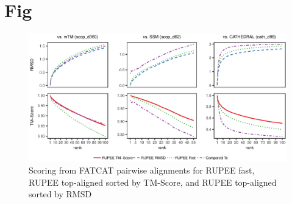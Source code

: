\documentclass[letter]{article}
\begin{document}
\section{Fig}

\begin{figure}[!h]
\begin{center}
    \includegraphics[width=6in, keepaspectratio]{S3Fig1}
\end{center}
\caption{Scoring from FATCAT pairwise alignments for RUPEE fast, RUPEE top-aligned sorted by TM-Score, and RUPEE top-aligned sorted by RMSD}
\label{fig:combined_scoring_fatcat}
\end{figure}
\end{document}
